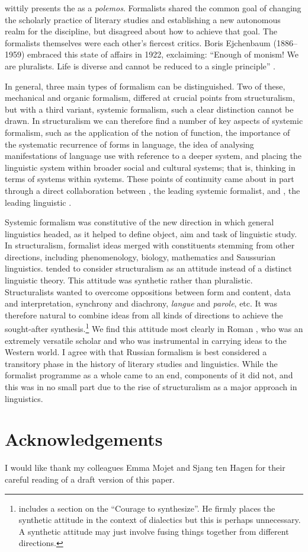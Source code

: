 \documentclass[output=paper]{langscibook}
\begin{document}
\citet{Steiner1984} wittily presents the  as a \emph{polemos}. Formalists shared the common goal of changing the scholarly practice of literary studies and establishing a new autonomous realm for the discipline, but disagreed about how to achieve that goal. The formalists themselves were each other's fiercest critics. Boris Ejchenbaum (1886--1959) embraced this state of affairs in 1922, exclaiming: ``Enough of monism! We are pluralists. Life is diverse and cannot be reduced to a single principle'' \citep[quoted in English in][259]{Steiner1984}.

In general, three main types of formalism can be distinguished. Two of these, mechanical and organic formalism, differed at crucial points from structuralism, but with a third variant, systemic formalism, such a clear distinction cannot be drawn. In structuralism we can therefore find a number of key aspects of systemic formalism, such as the application of the notion of function, the importance of the systematic recurrence of forms in language, the idea of analysing manifestations of language use with reference to a deeper system, and placing the linguistic system within broader social and cultural systems; that is, thinking in terms of systems within systems. These points of continuity came about in part through a direct collaboration between {\Tynjanov}, the leading systemic formalist, and {\Jakobson}, the leading linguistic .

Systemic formalism was constitutive of the new direction in which general linguistics headed, as it helped to define object, aim and task of linguistic study. In structuralism, formalist ideas merged with constituents stemming from other directions, including phenomenology, biology, mathematics and Saussurian linguistics. {\Mukarovsky} tended to consider structuralism as an attitude instead of a distinct linguistic theory. This attitude was synthetic rather than pluralistic. Structuralists wanted to overcome oppositions between form and content, data and interpretation, synchrony and diachrony, \emph{langue} and \emph{parole}, etc. It was therefore natural to combine ideas from all kinds of directions to achieve the sought-after synthesis.\footnote{\citet[150--152]{Toman1995} includes a section on the ``Courage to synthesize''. He firmly places the synthetic attitude in the context of dialectics but this is perhaps unnecessary. A synthetic attitude may just involve fusing things together from different directions.} We find this attitude most clearly in Roman {\Jakobson}, who was an extremely versatile scholar and who was instrumental in carrying  ideas to the Western world. I agree with \citet{Steiner1984} that Russian formalism is best considered a transitory phase in the history of literary studies and linguistics. While the formalist programme as a whole came to an end, components of it did not, and this was in no small part due to the rise of structuralism as a major approach in linguistics. 

\section*{Acknowledgements}

I would like thank my colleagues Emma Mojet and Sjang ten Hagen for their careful reading of a draft version of this paper.

\sloppy
\printbibliography[heading=subbibliography,notkeyword=this] 
\end{document}
